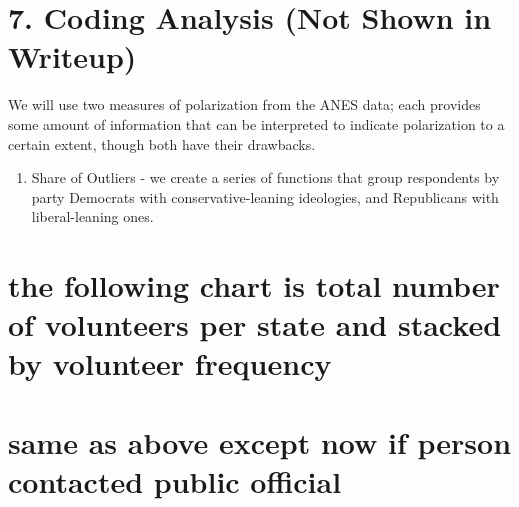 \documentclass[
  letterpaper,
  DIV=11,
  numbers=noendperiod]{scrartcl}
\providecommand{\tightlist}{%
  \setlength{\itemsep}{0pt}\setlength{\parskip}{0pt}}\usepackage{longtable,booktabs,array}
\begin{document}
\section{7. Coding Analysis (Not Shown in
Writeup)}\label{coding-analysis-not-shown-in-writeup}

We will use two measures of polarization from the ANES data; each
provides some amount of information that can be interpreted to indicate
polarization to a certain extent, though both have their drawbacks.

\begin{enumerate}
\def\labelenumi{\arabic{enumi}.}
\tightlist
\item
  Share of Outliers - we create a series of functions that group
  respondents by party Democrats with conservative-leaning ideologies,
  and Republicans with liberal-leaning ones.
\end{enumerate}

\section{the following chart is total number of volunteers per state and
stacked by volunteer
frequency}\label{the-following-chart-is-total-number-of-volunteers-per-state-and-stacked-by-volunteer-frequency}

\section{same as above except now if person contacted public
official}\label{same-as-above-except-now-if-person-contacted-public-official}
\end{document}
